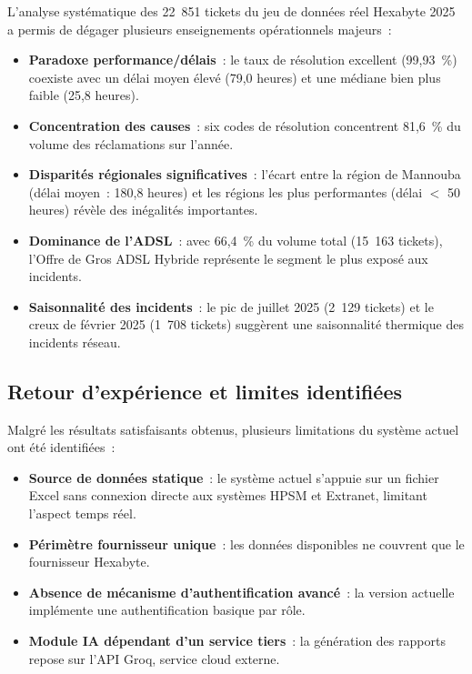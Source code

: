 \documentclass[11pt,a4paper]{report}
\begin{document}
L'analyse systématique des 22~851 tickets du jeu de données réel Hexabyte 2025 a permis de dégager plusieurs enseignements opérationnels majeurs~:

\begin{itemize}
  \item \textbf{Paradoxe performance/délais}~: le taux de résolution excellent (99,93~\%) coexiste avec un délai moyen élevé (79,0 heures) et une médiane bien plus faible (25,8 heures).
  \item \textbf{Concentration des causes}~: six codes de résolution concentrent 81,6~\% du volume des réclamations sur l'année.
  \item \textbf{Disparités régionales significatives}~: l'écart entre la région de Mannouba (délai moyen~: 180,8 heures) et les régions les plus performantes (délai $<$ 50 heures) révèle des inégalités importantes.
  \item \textbf{Dominance de l'ADSL}~: avec 66,4~\% du volume total (15~163 tickets), l'Offre de Gros ADSL Hybride représente le segment le plus exposé aux incidents.
  \item \textbf{Saisonnalité des incidents}~: le pic de juillet 2025 (2~129 tickets) et le creux de février 2025 (1~708 tickets) suggèrent une saisonnalité thermique des incidents réseau.
\end{itemize}

\subsection{Retour d'expérience et limites identifiées}

Malgré les résultats satisfaisants obtenus, plusieurs limitations du système actuel ont été identifiées~:

\begin{itemize}
  \item \textbf{Source de données statique}~: le système actuel s'appuie sur un fichier Excel sans connexion directe aux systèmes HPSM et Extranet, limitant l'aspect temps réel.
  \item \textbf{Périmètre fournisseur unique}~: les données disponibles ne couvrent que le fournisseur Hexabyte.
  \item \textbf{Absence de mécanisme d'authentification avancé}~: la version actuelle implémente une authentification basique par rôle.
  \item \textbf{Module IA dépendant d'un service tiers}~: la génération des rapports repose sur l'API Groq, service cloud externe.
\end{itemize}
\end{document}
